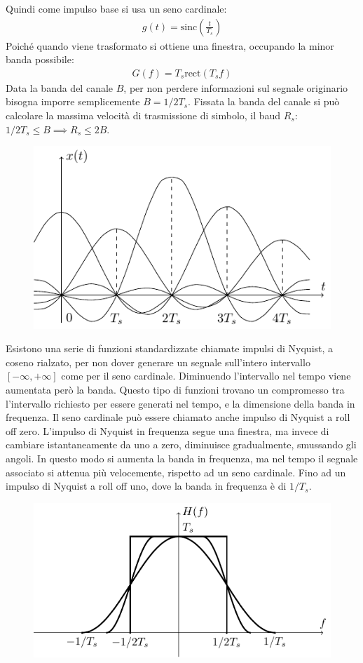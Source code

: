 \documentclass{article}
\newcommand{\rect}{\mathrm{rect}}
\newcommand{\sinc}{\mathrm{sinc}}
\numberwithin{equation}{subsection}
\begin{document}
Quindi come impulso base si usa un seno cardinale:
\begin{gather*}
    g(t)=\sinc\displaystyle\left(\frac{t}{T_s}\right)
\end{gather*}
Poiché quando viene trasformato si ottiene una finestra, occupando la minor banda possibile:
\begin{gather*}
    G(f)=T_s\rect(T_sf)
\end{gather*}
Data la banda del canale $B$, per non perdere informazioni sul segnale originario bisogna imporre semplicemente $B=1/2T_s$. Fissata la banda del canale 
si può calcolare la massima velocità di trasmissione di simbolo, il baud $R_s$: $1/2T_s\leq B\implies R_s\leq2B$. 
\begin{figure}[H]%
    \centering
    \includegraphics{impulso-sinc.pdf}%
\end{figure}
Esistono una serie di funzioni standardizzate chiamate impulsi di Nyquist, a coseno rialzato, per non dover generare un segnale sull'intero intervallo $[-\infty,+\infty]$ come 
per il seno cardinale. Diminuendo l'intervallo nel tempo viene aumentata però la banda. Questo tipo di funzioni trovano un compromesso tra l'intervallo richiesto per 
essere generati nel tempo, e la dimensione della banda in frequenza. Il seno cardinale può essere chiamato anche impulso di Nyquist a roll off zero. 
L'impulso di Nyquist in frequenza segue una finestra, ma invece di cambiare istantaneamente da uno a zero, diminuisce gradualmente, smussando gli angoli. In questo 
modo si aumenta la banda in frequenza, ma nel tempo il segnale associato si attenua più velocemente, rispetto ad un seno cardinale. 
Fino ad un impulso di Nyquist a roll off uno, dove la banda in frequenza è di $1/T_s$. 
\begin{figure}[H]%
    \centering
    \includegraphics{impulso-nyquist.pdf}
\end{figure}
\end{document}
